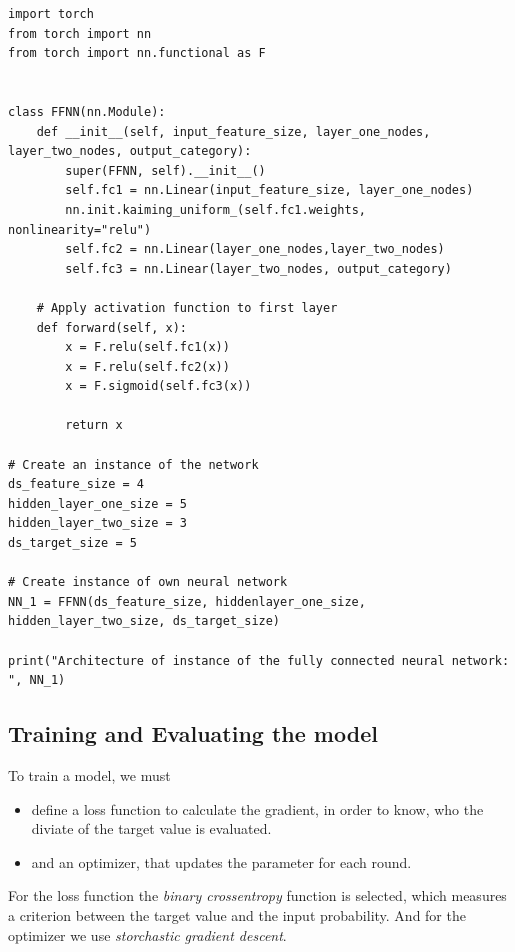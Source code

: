 \begin{lstlisting}[language=iPython, caption={Simple FFNN}]
import torch
from torch import nn
from torch import nn.functional as F


class FFNN(nn.Module):
    def __init__(self, input_feature_size, layer_one_nodes, layer_two_nodes, output_category):
        super(FFNN, self).__init__()
        self.fc1 = nn.Linear(input_feature_size, layer_one_nodes)
        nn.init.kaiming_uniform_(self.fc1.weights, nonlinearity="relu")
        self.fc2 = nn.Linear(layer_one_nodes,layer_two_nodes)
        self.fc3 = nn.Linear(layer_two_nodes, output_category)
	
	# Apply activation function to first layer 
    def forward(self, x):
        x = F.relu(self.fc1(x))
        x = F.relu(self.fc2(x))
        x = F.sigmoid(self.fc3(x))
        
        return x
        
# Create an instance of the network
ds_feature_size = 4
hidden_layer_one_size = 5
hidden_layer_two_size = 3
ds_target_size = 5

# Create instance of own neural network
NN_1 = FFNN(ds_feature_size, hiddenlayer_one_size, hidden_layer_two_size, ds_target_size)

print("Architecture of instance of the fully connected neural network: ", NN_1)
\end{lstlisting}

\subsection{Training and Evaluating the model}
To train a model, we must 
\begin{itemize}
	\item define a loss function to calculate the gradient, in order to know, who the diviate of the target value is evaluated.
	\item and an optimizer, that updates the parameter for each round.
\end{itemize}

For the loss function the \textit{binary crossentropy} function is selected, which measures a criterion between the target value and the input probability. And for the optimizer we use \textit{storchastic gradient descent}.\\



